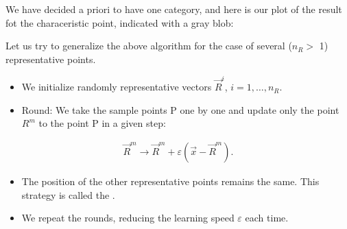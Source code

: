 \documentclass[letterpaper,10pt,english]{jupyterBook}
\begin{document}
\begin{sphinxVerbatim}[commandchars=\\\{\}]
\PYG{p}{[}\PYG{p}{[}\PYG{p}{]}\PYG{p}{[}\PYG{p}{]}\PYG{p}{]}
\end{sphinxVerbatim}

\begin{sphinxVerbatim}[commandchars=\\\{\}]
[0.602 0.481]
\end{sphinxVerbatim}

\sphinxAtStartPar
We have decided a priori to have one category, and here is our plot of the result fot the characeristic point, indicated with a gray blob:

\noindent{}

\sphinxAtStartPar
Let us try to generalize the above algorithm for the case of several (\( n_R> \) 1) representative points.
\begin{itemize}
\item {} 
\sphinxAtStartPar
We initialize randomly representative vectors \( \vec{R}^i \), \(i = 1, \dots, n_R \).

\item {} 
\sphinxAtStartPar
Round: We take the sample points P one by one and update only the  point \(R^m\) to the point P in a given step:

\end{itemize}
\begin{equation*}
\begin{split} \vec{R}^m \to \vec{R}^m + \varepsilon (\vec{x} - \vec{R}^m). \end{split}
\end{equation*}\begin{itemize}
\item {} 
\sphinxAtStartPar
The position of the other representative points remains the same. This strategy is called the .

\item {} 
\sphinxAtStartPar
We repeat the rounds, reducing the learning speed \( \varepsilon \) each time.

\end{itemize}
\end{document}
